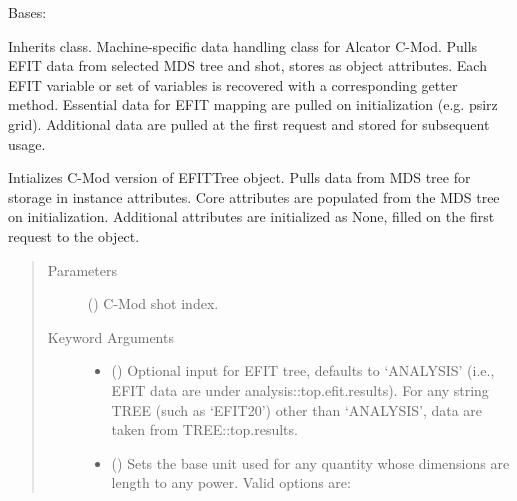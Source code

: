 \documentclass[letterpaper,10pt,english]{sphinxmanual}
\begin{document}
\begin{fulllineitems}
\label{\detokenize{eqtools:eqtools.CModEFIT.CModEFITTree}}
Bases: {\hyperref[\detokenize{eqtools:eqtools.EFIT.EFITTree}]{}}

Inherits {\hyperref[\detokenize{eqtools:eqtools.EFIT.EFITTree}]{}} class. Machine-specific data
handling class for Alcator C-Mod. Pulls EFIT data from selected MDS tree
and shot, stores as object attributes. Each EFIT variable or set of
variables is recovered with a corresponding getter method. Essential data
for EFIT mapping are pulled on initialization (e.g. psirz grid). Additional
data are pulled at the first request and stored for subsequent usage.

Intializes C-Mod version of EFITTree object.  Pulls data from MDS tree for
storage in instance attributes.  Core attributes are populated from the MDS
tree on initialization.  Additional attributes are initialized as None,
filled on the first request to the object.
\begin{quote}\begin{description}
\item[{Parameters}] \leavevmode
{} () \textendash{} C-Mod shot index.

\item[{Keyword Arguments}] \leavevmode\begin{itemize}
\item {} 
 () \textendash{} Optional input for EFIT tree, defaults to ‘ANALYSIS’
(i.e., EFIT data are under analysis::top.efit.results).
For any string TREE (such as ‘EFIT20’) other than ‘ANALYSIS’,
data are taken from TREE::top.results.

\item {} 
 () \textendash{} 
Sets the base unit used for any quantity whose
dimensions are length to any power. Valid options are:
\begin{quote}



\end{quote}
\end{itemize}
\end{description}
\end{quote}
\end{fulllineitems}
\end{document}
